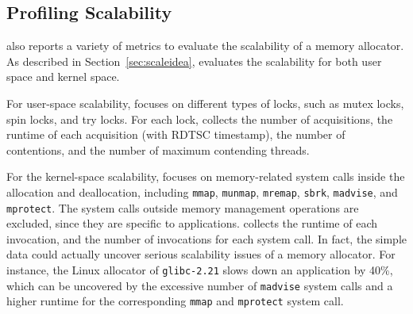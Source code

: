
  
 

\subsection{Profiling Scalability}
\MP{} also reports a variety of metrics to  evaluate the scalability of a memory allocator. As described in Section~\ref{sec:scaleidea}, \MP{} evaluates the scalability for both user space and kernel space. 

For user-space scalability, \MP{} focuses on different types of locks, such as mutex locks, spin locks, and try locks. For each lock, \MP{} collects the number of acquisitions, the runtime of each acquisition (with RDTSC timestamp), the number of contentions, and the number of maximum contending threads.  

For the kernel-space scalability, \MP{} focuses on memory-related system calls inside the allocation and deallocation, including \texttt{mmap}, \texttt{munmap}, \texttt{mremap}, \texttt{sbrk}, \texttt{madvise}, and \texttt{mprotect}. The system calls outside memory management operations are excluded, since they are specific to applications. \MP{} collects the runtime of each invocation, and the number of invocations for each system call. In fact, the simple data could actually uncover  serious scalability issues of a memory allocator. For instance, the Linux allocator of \texttt{glibc-2.21} slows down an application by 40\%, which can be uncovered by the excessive number of \texttt{madvise} system calls and a higher runtime for the corresponding \texttt{mmap} and \texttt{mprotect} system call.   

